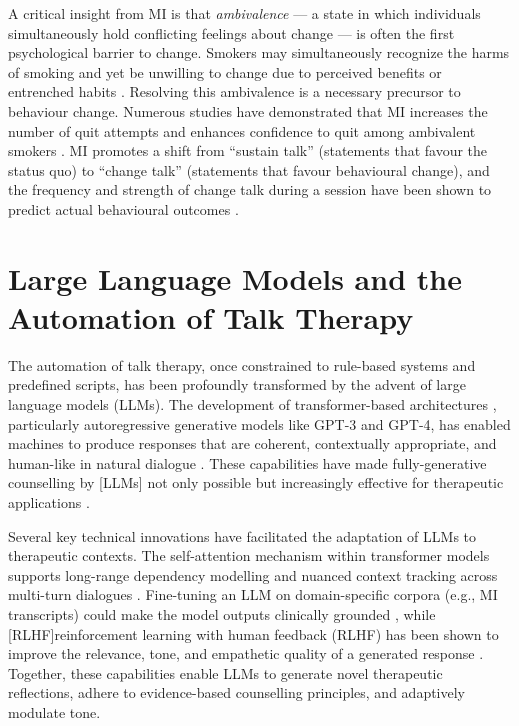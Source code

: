 A critical insight from MI is that \emph{ambivalence} --- a state in which individuals simultaneously hold conflicting feelings about change --- is often the first psychological barrier to change. Smokers may simultaneously recognize the harms of smoking and yet be unwilling to change due to perceived benefits or entrenched habits \cite{brown2023mi}. Resolving this ambivalence is a necessary precursor to behaviour change. Numerous studies have demonstrated that MI increases the number of quit attempts and enhances confidence to quit among ambivalent smokers \cite{Abar2013, Gwaltney2009-wj}. MI promotes a shift from ``sustain talk'' (statements that favour the status quo) to ``change talk'' (statements that favour behavioural change), and the frequency and strength of change talk during a session have been shown to predict actual behavioural outcomes \cite{apodaca2009mechanisms}.

\section{Large Language Models and the Automation of Talk Therapy}
The automation of talk therapy, once constrained to rule-based systems and predefined scripts, has been profoundly transformed by the advent of large language models (LLMs). The development of transformer-based architectures \cite{vaswani2017attention}, particularly autoregressive generative models like GPT-3 and GPT-4, has enabled machines to produce responses that are coherent, contextually appropriate, and human-like in natural dialogue \cite{openai2023gpt4}. These capabilities have made fully-generative counselling by [LLMs] not only possible but increasingly effective for therapeutic applications \cite{miner2020artificial, torous2023generative}.

Several key technical innovations have facilitated the adaptation of LLMs to therapeutic contexts. The self-attention mechanism within transformer models supports long-range dependency modelling and nuanced context tracking across multi-turn dialogues \cite{vaswani2017attention}. Fine-tuning an LLM on domain-specific corpora (e.g., MI transcripts) could make the model outputs clinically grounded \cite{valentino2024evaluating}, while [RLHF]reinforcement learning with human feedback (RLHF) has been shown to improve the relevance, tone, and empathetic quality of a generated response \cite{10.5555/3600270.3602281, gilson2023empathy}. Together, these capabilities enable LLMs to generate novel therapeutic reflections, adhere to evidence-based counselling principles, and adaptively modulate tone.




